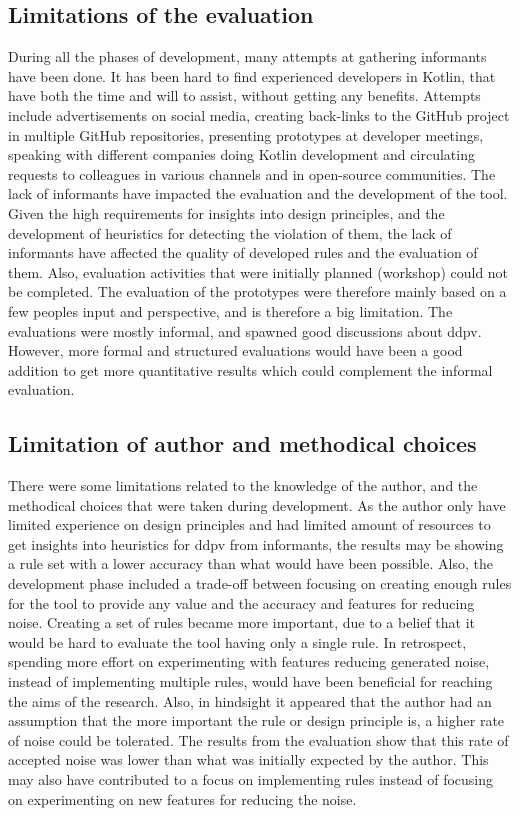 \documentclass[pdftex,10pt,b5paper,twoside]{report}
\begin{document}
\subsection*{Limitations of the evaluation}
During all the phases of development, many attempts at gathering informants have been done. It has been hard to find experienced developers in Kotlin, that have both the time and will to assist, without getting any benefits. Attempts include advertisements on social media, creating back-links to the GitHub project in multiple GitHub repositories, presenting prototypes at developer meetings, speaking with different companies doing Kotlin development and circulating requests to colleagues in various channels and in open-source communities. The lack of informants have impacted the evaluation and the development of the tool. Given the high requirements for insights into design principles, and the development of heuristics for detecting the violation of them, the lack of informants have affected the quality of developed rules and the evaluation of them. Also, evaluation activities that were initially planned (workshop) could not be completed. The evaluation of the prototypes were therefore mainly based on a few peoples input and perspective, and is therefore a big limitation. The evaluations were mostly informal, and spawned good discussions about \gls{ddpv}. However, more formal and structured evaluations would have been a good addition to get more quantitative results which could complement the informal evaluation.


\subsection*{Limitation of author and methodical choices}
There were some limitations related to the knowledge of the author, and the methodical choices that were taken during development. As the author only have limited experience on design principles and had limited amount of resources to get insights into heuristics for \gls{ddpv} from informants, the results may be showing a rule set with a lower accuracy than what would have been possible. Also, the development phase included a trade-off between focusing on creating enough rules for the tool to provide any value and the accuracy and features for reducing noise. Creating a set of rules became more important, due to a belief that it would be hard to evaluate the tool having only a single rule. In retrospect, spending more effort on experimenting with features reducing generated noise, instead of implementing multiple rules, would have been beneficial for reaching the aims of the research. Also, in hindsight it appeared that the author had an assumption that the more important the rule or design principle is, a higher rate of noise could be tolerated. The results from the evaluation show that this rate of accepted noise was lower than what was initially expected by the author. This may also have contributed to a focus on implementing rules instead of focusing on experimenting on new features for reducing the noise. 
\end{document}
